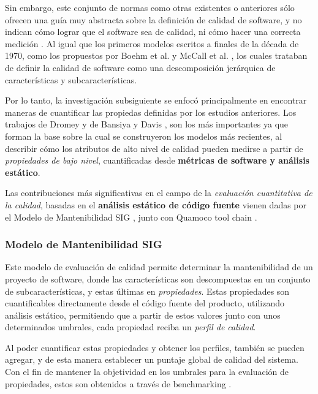 Sin embargo, este conjunto de normas como otras existentes o anteriores sólo ofrecen una
guía muy abstracta sobre la definición de calidad de software, y no indican cómo lograr
que el software sea de calidad, ni cómo hacer una correcta medición \cite{Relf04}.
Al igual que los primeros modelos escritos a finales de la década de 1970, como los
propuestos por Boehm et al. \cite{Boehm1978} y McCall et al. \cite{McCall1977}, los cuales trataban
de definir la calidad de software como una descomposición jerárquica de características y
subcaracterísticas.

Por lo tanto, la investigación subsiguiente se enfocó principalmente en encontrar maneras de
cuantificar las propiedas definidas por los estudios anteriores.
Los trabajos de Dromey \cite{Dromey1995} y de Bansiya y Davis \cite{Bansiya2002}, son los más 
importantes ya que forman la base sobre la cual se construyeron los modelos más recientes, al 
describir cómo los atributos de alto nivel de calidad pueden medirse a partir de \textit{propiedades
de bajo nivel}, cuantificadas desde \textbf{métricas de software y análisis estático}.

Las contribuciones más significativas en el campo de la \textit{evaluación cuantitativa de la calidad},
basadas en el \textbf{análisis estático de código fuente} vienen dadas por el Modelo de Mantenibilidad 
SIG \cite{Heitlager2007}, junto con Quamoco tool chain \cite{Wagner2012}.

\subsubsection{Modelo de Mantenibilidad SIG}

Este modelo de evaluación de calidad \cite{Heitlager2007} permite determinar la mantenibilidad
de un proyecto de software, donde las características son descompuestas en un
conjunto de subcaracterísticas, y estas últimas en \textit{propiedades}.
Estas propiedades son cuantificables directamente desde el código fuente del producto, utilizando
análisis estático, permitiendo que a partir de estos valores junto con unos determinados umbrales,
cada propiedad reciba un \textit{perfil de calidad}.

Al poder cuantificar estas propiedades y obtener los perfiles, también se pueden agregar,
y de esta manera establecer un puntaje global de calidad del sistema.
Con el fin de mantener la objetividad en los umbrales para la evaluación de propiedades,
estos son obtenidos a través de benchmarking \cite{Alves2010}.

